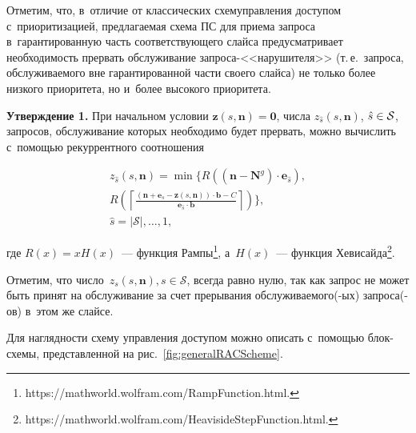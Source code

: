 \begin{multicols}{2}
Отметим, что, в~отличие от классических схем\linebreak управ\-ле\-ния доступом 
с~приоритизацией, предлагаемая схема ПС для приема запроса в~гарантированную часть 
соответствующего слайса \mbox{предусмат\-ри\-ва\-ет} необходимость прервать обслуживание 
за\-про\-са-<<на\-ру\-ши\-те\-ля>> (т.\,е.\ запроса, об\-слу\-жи\-ва\-емо\-го вне гарантированной час\-ти 
своего слайса) не только более низкого приоритета, но и~более высокого 
приоритета.



\noindent
\textbf{Утверждение 1.}
При начальном условии $\mathbf{z}\left(s,\mathbf{n}\right)=\mathbf{0}$, числа 
$z_{\hat{s}}\left(s,\mathbf{n}\right)$, $\hat{s}\hm\in\mathcal{S}$, запросов, 
обслуживание которых необходимо будет прервать, можно вычислить с~по\-мощью 
рекуррентного соотношения

\vspace*{-6pt}

\noindent
\begin{multline}
\label{eq:capabilityFunc}
z_{\hat{s}}\left(s,\mathbf{n}\right) = \min
\biggl\{
R \left(\left(\mathbf{n}-\mathbf{N}^{g}\right) \cdot 
\mathbf{e}_{\hat{s}}\right), \\[-3pt]
R \left(\left\lceil \frac{\left(\mathbf{n}+\mathbf{e}_s - 
\mathbf{z}\left(s,\mathbf{n}\right) \right)\cdot\mathbf{b} - 
C}{\mathbf{e}_{\hat{s}}\cdot\mathbf{b}} \right\rceil\right)\!\!
\biggl\},\\[-3pt]
\hat{s} = \lvert\mathcal{S}\rvert,\ldots,1,
\end{multline}

\columnbreak

\noindent
где $R\left(x\right)=xH\left(x\right)$~--- функция 
Рампы\footnote{{\sf https://mathworld.wolfram.com/RampFunction.html.}}, 
а~$H\left(x\right)$~--- функция 
Хевисайда\footnote{{\sf https://mathworld.wolfram.com/HeavisideStepFunction.html.}}.

\smallskip

Отметим, что число~$z_s\left(s,\mathbf{n}\right), 
s\in\mathcal{S}$, всегда равно нулю, так как запрос не может быть принят на 
обслуживание за счет прерывания об\-слу\-жи\-ва\-емо\-\mbox{го(-ых)} за\-про\-са(-ов) в~этом же 
слайсе.

Для наглядности схему управ\-ле\-ния до\-сту\-пом можно описать с~по\-мощью блок-схе\-мы, 
пред\-став\-лен\-ной на рис.~\ref{fig:generalRACScheme}.

\vspace*{-14pt}



\end{multicols}
